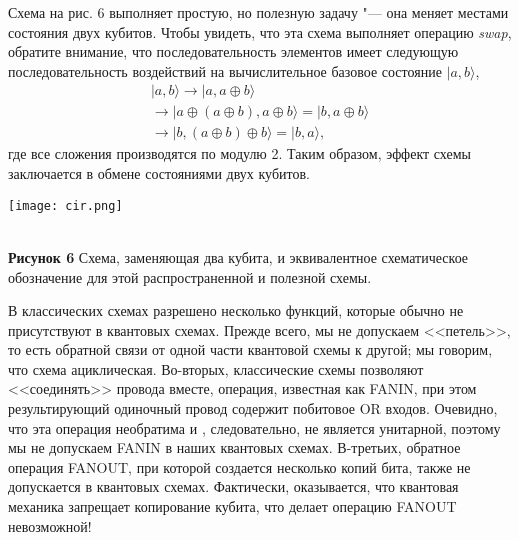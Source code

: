 \begin{multicols}{2}
{        Схема на рис. 6 выполняет простую, но полезную задачу "--- она меняет местами состояния
        двух кубитов. Чтобы увидеть, что эта схема выполняет операцию \emph{swap}, обратите внимание, что
        последовательность элементов имеет следующую последовательность воздействий на вычислительное базовое состояние $\vert a,b\rangle$,
        \begin{equation}
            \begin{split}
                \vert a,b \rangle \longrightarrow \vert a,a\oplus b\rangle\\
                \longrightarrow \vert a\oplus(a\oplus b),a\oplus b\rangle = \vert b,a\oplus b\rangle\\
                \longrightarrow \vert b,(a\oplus b)\oplus b \rangle=\vert b,a\rangle,
            \end{split}
        \end{equation}
        где все сложения производятся по модулю 2. Таким образом, эффект схемы заключается в обмене состояниями двух кубитов.
    }\\
    \begin{flushleft}
        \begin{minipage}{0.3\textwidth}{\texttt{[image: cir.png]}}
        \end{minipage}\\
        \vspace{0.3cm}
        \footnotesize{\textbf{Рисунок 6} Схема, заменяющая два кубита, и эквивалентное схематическое обозначение для этой распространенной и полезной схемы.}
    \end{flushleft}
    \normalsize{
        В классических схемах разрешено несколько функций, которые обычно не присутствуют в
        квантовых схемах. Прежде всего, мы не допускаем <<петель>>, то есть обратной связи от одной части
        квантовой схемы к другой; мы говорим, что схема ациклическая. Во-вторых, классические схемы позволяют
        <<соединять>> провода вместе, операция, известная как FANIN, при этом результирующий одиночный провод
        содержит побитовое OR входов. Очевидно, что эта операция необратима и
        , следовательно, не является унитарной, поэтому мы не допускаем FANIN в наших квантовых схемах. В-третьих, обратное
        операция FANOUT, при которой создается несколько копий бита, также не допускается в
        квантовых схемах. Фактически, оказывается, что квантовая механика запрещает копирование
        кубита, что делает операцию FANOUT невозможной!

}
\end{multicols}
